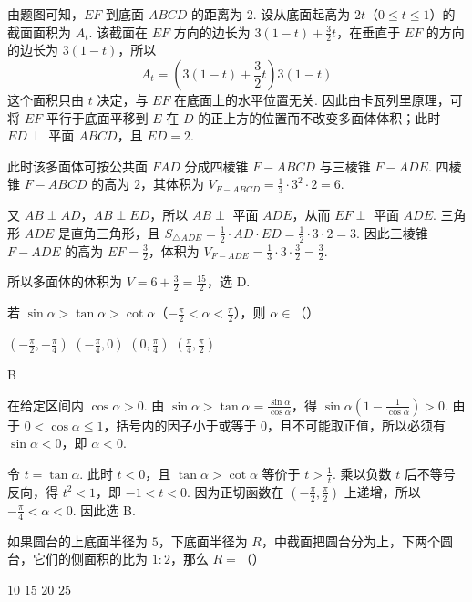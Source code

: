 \documentclass[UTF8,a4paper,oneside,11pt]{ctexbook}
\begin{document}
\begin{solution}
由题图可知，\(EF\) 到底面 \(ABCD\) 的距离为 \(2\). 设从底面起高为 \(2t\)（\(0\leqslant t\leqslant1\)）的截面面积为 \(A_t\). 该截面在 \(EF\) 方向的边长为 \(3(1-t)+\frac32t\)，在垂直于 \(EF\) 的方向的边长为 \(3(1-t)\)，所以
\[
A_t=\left(3(1-t)+\frac32t\right)3(1-t)
\]
这个面积只由 \(t\) 决定，与 \(EF\) 在底面上的水平位置无关. 因此由卡瓦列里原理，可将 \(EF\) 平行于底面平移到 \(E\) 在 \(D\) 的正上方的位置而不改变多面体体积；此时 \(ED\perp\) 平面 \(ABCD\)，且 \(ED=2\).

此时该多面体可按公共面 \(FAD\) 分成四棱锥 \(F-ABCD\) 与三棱锥 \(F-ADE\). 四棱锥 \(F-ABCD\) 的高为 \(2\)，其体积为
\(V_{F-ABCD}=\frac13\cdot3^2\cdot2=6\).

又 \(AB\perp AD\)，\(AB\perp ED\)，所以 \(AB\perp\) 平面 \(ADE\)，从而 \(EF\perp\) 平面 \(ADE\). 三角形 \(ADE\) 是直角三角形，且
\(S_{\triangle ADE}=\frac12\cdot AD\cdot ED=\frac12\cdot3\cdot2=3\).
因此三棱锥 \(F-ADE\) 的高为 \(EF=\frac32\)，体积为
\(V_{F-ADE}=\frac13\cdot3\cdot\frac32=\frac32\).

所以多面体的体积为
\(V=6+\frac32=\frac{15}{2}\)，选 D.
\end{solution}

\begin{problem}
若 \(\sin\alpha>\tan\alpha>\cot\alpha\)（\(-\frac{\pi}{2}<\alpha<\frac{\pi}{2}\)），则 \(\alpha\in\)（\quad）

\choices
    {\(\left(-\frac{\pi}{2},-\frac{\pi}{4}\right)\)}
    {\(\left(-\frac{\pi}{4},0\right)\)}
    {\(\left(0,\frac{\pi}{4}\right)\)}
    {\(\left(\frac{\pi}{4},\frac{\pi}{2}\right)\)}
\end{problem}

\begin{answer}
B
\end{answer}

\begin{solution}
在给定区间内 \(\cos\alpha>0\). 由
\(\sin\alpha>\tan\alpha=\frac{\sin\alpha}{\cos\alpha}\)，得
\(\sin\alpha\left(1-\frac1{\cos\alpha}\right)>0\).
由于 \(0<\cos\alpha\leqslant1\)，括号内的因子小于或等于 \(0\)，且不可能取正值，所以必须有 \(\sin\alpha<0\)，即 \(\alpha<0\).

令 \(t=\tan\alpha\). 此时 \(t<0\)，且 \(\tan\alpha>\cot\alpha\) 等价于 \(t>\frac{1}{t}\). 乘以负数 \(t\) 后不等号反向，得 \(t^2<1\)，即 \(-1<t<0\). 因为正切函数在 \((-\frac\pi2,\frac\pi2)\) 上递增，所以
\(-\frac\pi4<\alpha<0\). 因此选 B.
\end{solution}

\begin{problem}
如果圆台的上底面半径为 \(5\)，下底面半径为 \(R\)，中截面把圆台分为上，下两个圆台，它们的侧面积的比为 \(1:2\)，那么 \(R=\)（\quad）

\choices
    {\(10\)}
    {\(15\)}
    {\(20\)}
    {\(25\)}
\end{problem}
\end{document}
